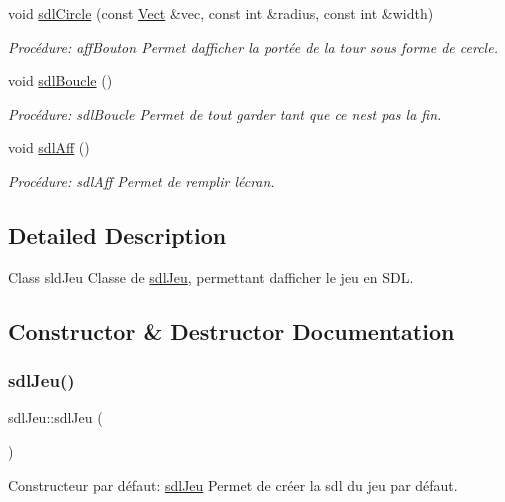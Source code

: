\begin{DoxyCompactItemize}
void \hyperlink{classsdlJeu_a75a0ab9c8235020b2d8b99018f074325}{sdl\+Circle} (const \hyperlink{classVect}{Vect} \&vec, const int \&radius, const int \&width)
\begin{DoxyCompactList}\small\item\em Procédure\+: aff\+Bouton Permet d\textquotesingle{}afficher la portée de la tour sous forme de cercle. \end{DoxyCompactList}\item 
void \hyperlink{classsdlJeu_a5628835d7efcab056985c3aa3de56836}{sdl\+Boucle} ()
\begin{DoxyCompactList}\small\item\em Procédure\+: sdl\+Boucle Permet de tout garder tant que ce n\textquotesingle{}est pas la fin. \end{DoxyCompactList}\item 
void \hyperlink{classsdlJeu_aedada55e3f96ba37493664d358dc7b60}{sdl\+Aff} ()
\begin{DoxyCompactList}\small\item\em Procédure\+: sdl\+Aff Permet de remplir l\textquotesingle{}écran. \end{DoxyCompactList}\end{DoxyCompactItemize}


\subsection{Detailed Description}
Class sld\+Jeu Classe de \hyperlink{classsdlJeu}{sdl\+Jeu}, permettant d\textquotesingle{}afficher le jeu en S\+DL. 

\subsection{Constructor \& Destructor Documentation}
\mbox{\label{classsdlJeu_a06ba2075a4b592f6d0a2e268c29a044e}} 
\subsubsection{\texorpdfstring{sdl\+Jeu()}{sdlJeu()}}
{\footnotesize\ttfamily sdl\+Jeu\+::sdl\+Jeu (\begin{DoxyParamCaption}{ }\end{DoxyParamCaption})}



Constructeur par défaut\+: \hyperlink{classsdlJeu}{sdl\+Jeu} Permet de créer la sdl du jeu par défaut. 


